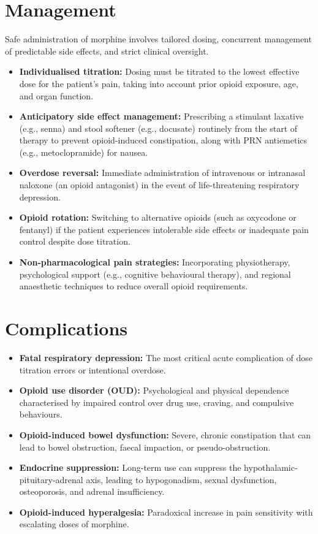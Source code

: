\section*{Management}
Safe administration of morphine involves tailored dosing, concurrent management of predictable side effects, and strict clinical oversight.
\begin{itemize}
    \item \textbf{Individualised titration:} Dosing must be titrated to the lowest effective dose for the patient's pain, taking into account prior opioid exposure, age, and organ function.
    \item \textbf{Anticipatory side effect management:} Prescribing a stimulant laxative (e.g., senna) and stool softener (e.g., docusate) routinely from the start of therapy to prevent opioid-induced constipation, along with PRN antiemetics (e.g., metoclopramide) for nausea.
    \item \textbf{Overdose reversal:} Immediate administration of intravenous or intranasal naloxone (an opioid antagonist) in the event of life-threatening respiratory depression.
    \item \textbf{Opioid rotation:} Switching to alternative opioids (such as oxycodone or fentanyl) if the patient experiences intolerable side effects or inadequate pain control despite dose titration.
    \item \textbf{Non-pharmacological pain strategies:} Incorporating physiotherapy, psychological support (e.g., cognitive behavioural therapy), and regional anaesthetic techniques to reduce overall opioid requirements.
\end{itemize}

\section*{Complications}
\begin{itemize}
    \item \textbf{Fatal respiratory depression:} The most critical acute complication of dose titration errors or intentional overdose.
    \item \textbf{Opioid use disorder (OUD):} Psychological and physical dependence characterised by impaired control over drug use, craving, and compulsive behaviours.
    \item \textbf{Opioid-induced bowel dysfunction:} Severe, chronic constipation that can lead to bowel obstruction, faecal impaction, or pseudo-obstruction.
    \item \textbf{Endocrine suppression:} Long-term use can suppress the hypothalamic-pituitary-adrenal axis, leading to hypogonadism, sexual dysfunction, osteoporosis, and adrenal insufficiency.
    \item \textbf{Opioid-induced hyperalgesia:} Paradoxical increase in pain sensitivity with escalating doses of morphine.
\end{itemize}

